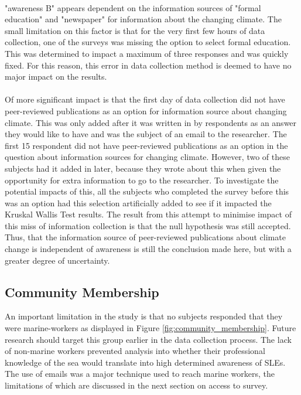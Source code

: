 \paragraph{}
"awareness B" appears dependent on the information sources of "formal education" and "newspaper" for information about the changing climate. The small limitation on this factor is that for the very first few hours of data collection, one of the surveys was missing the option to select formal education. This was determined to impact a maximum of three responses and was quickly fixed. For this reason, this error in data collection method is deemed to have no major impact on the results. 
\paragraph{}
Of more significant impact is that the first day of data collection did not have peer-reviewed publications as an option for information source about changing climate. This was only added after it was written in by respondents as an answer they would like to have and was the subject of an email to the researcher.  The first 15 respondent did not have peer-reviewed publications as an option in the question about information sources for changing climate. However, two of these subjects had it added in later, because they wrote about this when given the opportunity for extra information to go to the researcher. To investigate the potential impacts of this, all the subjects who completed the survey before this was an option had this selection artificially added to see if it impacted the Kruskal Wallis Test results. The result from this attempt to minimise impact of this miss of information collection is that the null hypothesis was still accepted. Thus, that the information source of peer-reviewed publications about climate change is independent of awareness is still the conclusion made here, but with a greater degree of uncertainty.
\paragraph{}


\subsection{Community Membership}
An important limitation in the study is that no subjects responded that they were marine-workers as displayed in Figure \ref{fig:community_membership}. Future research should target this group earlier in the data collection process. The lack of non-marine workers prevented analysis into whether their professional knowledge of the sea would translate into high determined awareness of SLEs. The use of emails was a major technique used to reach marine workers, the limitations of which are discussed in the next section on access to survey. 

